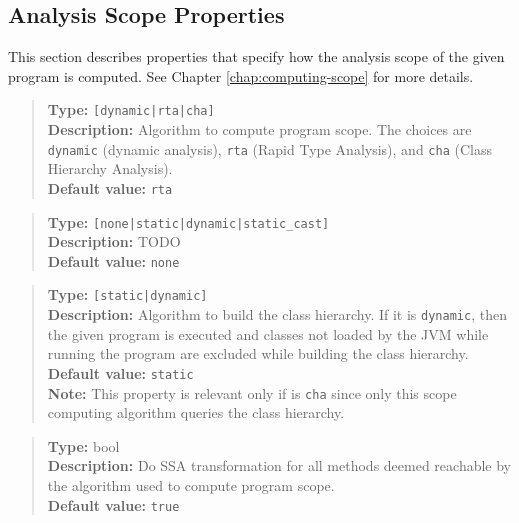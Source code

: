 \subsection{Analysis Scope Properties}
\label{sec:scope-props}

This section describes properties that specify how the analysis scope of the given program is computed.
See Chapter \ref{chap:computing-scope} for more details.
\\[10pt]

\begin{quote}
{\bf Type:} {\tt [dynamic|rta|cha]} \\
{\bf Description:} Algorithm to compute program scope.  The choices are {\tt dynamic} (dynamic analysis), {\tt rta} (Rapid Type Analysis), and {\tt cha} (Class Hierarchy Analysis). \\
{\bf Default value:} {\tt rta}
\end{quote}

\begin{quote}
{\bf Type:} {\tt [none|static|dynamic|static\_cast]} \\
{\bf Description:} TODO \\
{\bf Default value:} {\tt none}
\end{quote}

\begin{quote}
{\bf Type:} {\tt [static|dynamic]} \\
{\bf Description:} Algorithm to build the class hierarchy.  If it is {\tt dynamic}, then the given program is executed and classes not loaded by the JVM while running the program are excluded while building the class hierarchy. \\
{\bf Default value:} {\tt static} \\
{\bf Note:} This property is relevant only if  is {\tt cha} since only this scope computing algorithm queries the class hierarchy. 
\end{quote}

\begin{quote}
{\bf Type:} bool  \\
{\bf Description:} Do SSA transformation for all methods deemed reachable by the algorithm used to compute program scope. \\
{\bf Default value:} {\tt true}
\end{quote}



